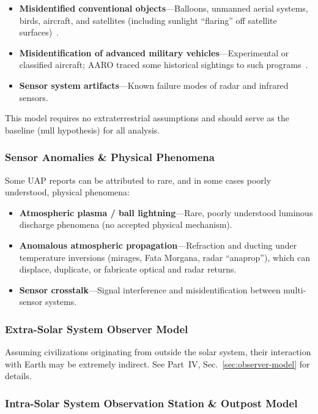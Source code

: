 \documentclass[aps,prd,twocolumn,superscriptaddress,nofootinbib]{revtex4-2}
\begin{document}
\begin{itemize}
  \item \textbf{Misidentified conventional objects}---Balloons, unmanned aerial systems, birds, aircraft, and satellites (including sunlight ``flaring'' off satellite surfaces)~\cite{AARO2026}.
  \item \textbf{Misidentification of advanced military vehicles}---Experimental or classified aircraft; AARO traced some historical sightings to such programs~\cite{AARO2024}.
  \item \textbf{Sensor system artifacts}---Known failure modes of radar and infrared sensors.
\end{itemize}

This model requires no extraterrestrial assumptions and should serve as the baseline (null hypothesis) for all analysis.

\subsubsection{Sensor Anomalies \& Physical Phenomena}\label{sec:sensor-anomalies}

Some UAP reports can be attributed to rare, and in some cases poorly understood, physical phenomena:

\begin{itemize}
  \item \textbf{Atmospheric plasma / ball lightning}---Rare, poorly understood luminous discharge phenomena (no accepted physical mechanism).
  \item \textbf{Anomalous atmospheric propagation}---Refraction and ducting under temperature inversions (mirages, Fata Morgana, radar ``anaprop''), which can displace, duplicate, or fabricate optical and radar returns.
  \item \textbf{Sensor crosstalk}---Signal interference and misidentification between multi-sensor systems.
\end{itemize}

\subsubsection{Extra-Solar System Observer Model}\label{sec:extra-solar}

Assuming civilizations originating from outside the solar system, their interaction with Earth may be extremely indirect. See Part~IV, Sec.~\ref{sec:observer-model} for details.

\subsubsection{Intra-Solar System Observation Station \& Outpost Model}\label{sec:intra-solar}
\end{document}
